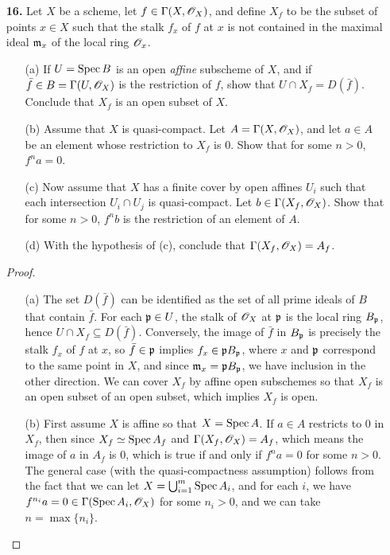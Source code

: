 \documentclass{article}
\begin{document}
\begin{enumerate} [label=\textbf{\arabic*.}, leftmargin=0em]
\item[\textbf{16.}] Let $X$ be a scheme, let $f \in \Gamma(X, \mathscr{O}_X)$, and define $X_f$ to be the subset of points $x \in X$ such that the stalk $f_x$ of $f$ at $x$ is not contained in the maximal ideal $\mathfrak{m}_x$ of the local ring $\mathscr{O}_x$.
\begin{itemize}
    \item[(a)] If $U = \operatorname{Spec}{B}$ is an open \textit{affine} subscheme of $X$, and if $\bar{f} \in B = \Gamma(U, \mathscr{O}_X)$ is the restriction of $f$, show that $U \cap X_f = D(\bar{f})$. Conclude that $X_f$ is an open subset of $X$.
    \item[(b)] Assume that $X$ is quasi-compact. Let $A = \Gamma(X, \mathscr{O}_X)$, and let $a \in A$ be an element whose restriction to $X_f$ is $0$. Show that for some $n > 0$, $f^n a = 0$.
    \item[(c)] Now assume that $X$ has a finite cover by open affines $U_i$ such that each intersection $U_i \cap U_j$ is quasi-compact. Let $b \in \Gamma(X_f, \mathscr{O}_X)$. Show that for some $n > 0$, $f^n b$ is the restriction of an element of $A$.
    \item[(d)] With the hypothesis of (c), conclude that $\Gamma(X_f, \mathscr{O}_{X}) = A_f$.
\end{itemize}

\begin{proof} $ $ \vspace{0pt}
    \begin{itemize} [leftmargin=0cm]
        \item[(a)] The set $D(\bar{f})$ can be identified as the set of all prime ideals of $B$ that contain $\bar{f}$. For each $\mathfrak{p} \in U$, the stalk of $\mathscr{O}_X$ at $\mathfrak{p}$ is the local ring $B_{\mathfrak{p}}$, hence $U \cap X_f \subseteq D(\bar{f})$. Conversely, the image of $\bar{f}$ in $B_{\mathfrak{p}}$ is precisely the stalk $f_x$ of $f$ at $x$, so $\bar{f} \in \mathfrak{p}$ implies $f_x \in \mathfrak{p}B_{\mathfrak{p}}$, where $x$ and $\mathfrak{p}$ correspond to the same point in $X$, and since $\mathfrak{m}_x = \mathfrak{p} B_{\mathfrak{p}}$, we have inclusion in the other direction. We can cover $X_f$ by affine open subschemes so that $X_f$ is an open subset of an open subset, which implies $X_f$ is open.

        \item[(b)] First assume $X$ is affine so that $X = \operatorname{Spec}{A}$. If $a \in A$ restricts to $0$ in $X_f$, then since $X_f \simeq \operatorname{Spec}{A_f}$ and $\Gamma(X_f, \mathscr{O}_X) = A_f$, which means the image of $a$ in $A_f$ is $0$, which is true if and only if $f^n a = 0$ for some $n > 0$. The general case (with the quasi-compactness assumption) follows from the fact that we can let $X = \bigcup_{i = 1}^m \operatorname{Spec}{A_i}$, and for each $i$, we have $f^{n_i} a = 0 \in \Gamma(\operatorname{Spec}{A_i}, \mathscr{O}_X)$ for some $n_i > 0$, and we can take $n = \max\{ n_i \}$.


\end{itemize}
\end{proof}
\end{enumerate}
\end{document}
